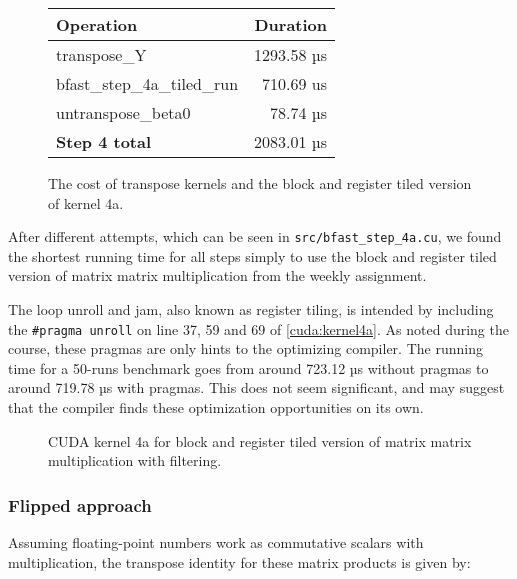 \begin{figure}[H]
    \centering
    \begin{tabular}{l r}
        \textbf{Operation} & \textbf{Duration} \\ \hline
        transpose\_Y                & 1293.58 µs \\
        bfast\_step\_4a\_tiled\_run & 710.69 us \\
        untranspose\_beta0          & 78.74 µs \\
        \textbf{Step 4 total}              &  2083.01 µs
    \end{tabular}
    \caption{The cost of transpose kernels and the block and register tiled
    version of kernel 4a.}
        \label{tbl:transposecost}
\end{figure}

After different attempts, which can be seen in \texttt{src/bfast\_step\_4a.cu},
we found the shortest running time for all steps simply to use the block and
register tiled version of matrix matrix multiplication from the weekly
assignment. 

The loop unroll and jam, also known as register tiling, is intended by including
the \texttt{\#pragma unroll} on line 37, 59 and 69 of \autoref{cuda:kernel4a}.
As noted during the course, these pragmas are only hints to the optimizing
compiler. The running time for a 50-runs benchmark goes from around 723.12 µs
without pragmas to around 719.78 µs with pragmas. This does not seem
significant, and may suggest that the compiler finds these optimization
opportunities on its own.



\begin{figure}[H]
    \centering
    \caption{CUDA kernel 4a for block and register tiled version of matrix matrix
    multiplication with filtering.}
    \label{cuda:kernel4a}
\end{figure}



\subsubsection{Flipped approach}
Assuming floating-point numbers work as commutative scalars with
multiplication, the transpose identity for these matrix products is given by:

